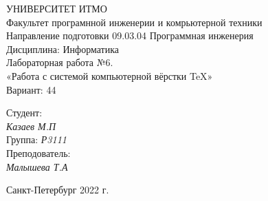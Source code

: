 \begin{center}
\hfill \break
\large{УНИВЕРСИТЕТ ИТМО}\\
\hfill \break
\normalsize{Факультет програмнной инженерии и комрьютерной техники\\Направление подготовки 09.03.04 Программная инженерия\\Дисциплина: Информатика}\\
\vfill
\normalsize{Лабораторная работа №6.\\«Работа с системой компьютерной вёрстки \TeX{}»\\ Вариант: 44}\\
\vfill
\end{center}
\begin{flushright}
\onehalfspacing
  Студент:\\ \textit{Казаев М.П}\\
  Группа: \textit{Р3111} \\
  Преподователь:\\ \textit{Малышева Т.А}\\
\end{flushright}
\vfill
\begin{center} Санкт-Петербург 2022 г.\end{center}
\thispagestyle{empty} 
\newpage